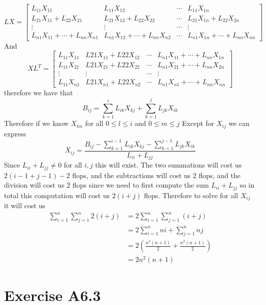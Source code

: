 $$LX=\begin{bmatrix}
    L_{11}X_{11} & L_{11}X_{12} & \cdots & L_{11}X_{1n} \\
    L_{21}X_{11}+L_{22}X_{21} & L_{21}X_{12}+L_{22}X_{22} & \cdots & L_{21}X_{1n}+L_{22}X_{2n} \\
    \vdots & \vdots & \cdots & \vdots \\
    L_{n1}X_{11}+\cdots+L_{nn}X_{n1} & L_{n1}X_{12}+\cdots+L_{nn}X_{n2} & \cdots & L_{n1}X_{1n}+\cdots+L_{nn}X_{nn}
\end{bmatrix}$$
And 
$$XL^T=\begin{bmatrix}
    L_{11}X_{11} & L{21}X_{11}+L{22}X_{12}& \cdots & L_{n1}X_{11}+\cdots+L_{nn}X_{1n} \\
    L_{11}X_{21} & L{21}X_{21}+L{22}X_{22}& \cdots & L_{n1}X_{21}+\cdots+L_{nn}X_{2n} \\
    \vdots & \vdots & \cdots & \vdots \\
    L_{11}X_{n1} & L{21}X_{n1}+L{22}X_{n2}& \cdots & L_{n1}X_{n1}+\cdots+L_{nn}X_{nn}
\end{bmatrix}$$
therefore we have that 
$$B_{ij}=\sum_{k=1}^i L_{ik}X_{kj}+\sum_{k=1}^j L_{jk}X_{ik}$$
Therefore if we know $X_{lm}$ for all $0 \leq l\leq i$ and $0\leq m\leq j$ 
Except for $X_{ij}$ we can express
$$X_{ij}=\frac{B_{ij}-\sum_{k=1}^{i-1} L_{ik}X_{kj}-\sum_{k=1}^{j-1} L_{jk}X_{ik}}{L_{ii}+L_{jj}}$$
Since $L_{ii}+L_{jj}\neq 0$ for all $i,j$ this will exist. The two summations will cost us $2(i-1+j-1)-2$ flops, and the subtractions will cost us
2 flops, and the division will cost us 2 flops since we need to first compute the sum 
$L_{ii}+L_{jj}$
so in total this computation will cost us $2(i+j)$ flops.
Therefore to solve for all $X_{ij}$ it will cost us
\begin{align*}
    \sum_{i=1}^n\sum_{j=1}^n 2(i+j) &= 2\sum_{i=1}^n\sum_{j=1}^n (i+j) \\
    &=2\sum_{i=1}^n ni+\sum_{j=1}^n nj \\
    &=2\left(\frac{n^2(n+1)}{2}+\frac{n^2(n+1)}{2} \right)\\
    &=\boxed{2n^2(n+1)}
\end{align*}
\section*{Exercise A6.3}
